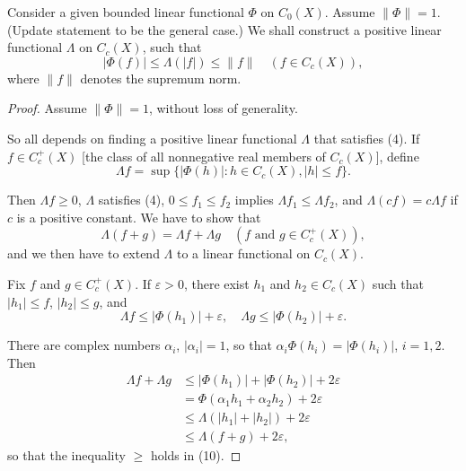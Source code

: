\begin{lemma}
  \label{lem:exists_pos_lin_func}
  Consider a given bounded linear functional $\Phi$ on $C_0(X)$.
  Assume $\|\Phi\| = 1$. (Update statement to be the general case.)
  We shall construct a positive linear functional $\Lambda$ on $C_c(X)$, such that
  \begin{equation}
    |\Phi(f)| \leq \Lambda(|f|) \leq \|f\| \quad (f \in C_c(X)), \tag{4}
  \end{equation}
  where $\|f\|$ denotes the supremum norm.
\end{lemma}

\begin{proof}
  Assume $\|\Phi\| = 1$, without loss of generality.

  So all depends on finding a positive linear functional $\Lambda$ that satisfies (4).
  If $f \in C_c^+(X)$ [the class of all nonnegative real members of $C_c(X)$], define
  \begin{equation}
    \Lambda f = \sup \{|\Phi(h)| : h \in C_c(X), |h| \leq f\}. \tag{9}
  \end{equation}

  Then $\Lambda f \geq 0$, $\Lambda$ satisfies (4), $0 \leq f_1 \leq f_2$ implies $\Lambda f_1 \leq \Lambda f_2$, and $\Lambda(cf) = c\Lambda f$ if $c$ is a positive constant.
  We have to show that
  \begin{equation}
    \Lambda(f + g) = \Lambda f + \Lambda g \quad (f \text{ and } g \in C_c^+(X)), \tag{10}
  \end{equation}
  and we then have to extend $\Lambda$ to a linear functional on $C_c(X)$.

  Fix $f$ and $g \in C_c^+(X)$.
  If $\varepsilon > 0$, there exist $h_1$ and $h_2 \in C_c(X)$ such that $|h_1| \leq f$, $|h_2| \leq g$, and
  \begin{equation}
    \Lambda f \leq |\Phi(h_1)| + \varepsilon, \quad \Lambda g \leq |\Phi(h_2)| + \varepsilon. \tag{11}
  \end{equation}

  There are complex numbers $\alpha_i$, $|\alpha_i| = 1$, so that $\alpha_i \Phi(h_i) = |\Phi(h_i)|$, $i = 1, 2$.
  Then
  \begin{align}
    \Lambda f + \Lambda g & \leq |\Phi(h_1)| + |\Phi(h_2)| + 2\varepsilon      \\
                          & = \Phi(\alpha_1 h_1 + \alpha_2 h_2) + 2\varepsilon \\
                          & \leq \Lambda(|h_1| + |h_2|) + 2\varepsilon         \\
                          & \leq \Lambda(f + g) + 2\varepsilon,
  \end{align}
  so that the inequality $\geq$ holds in (10).


\end{proof}
